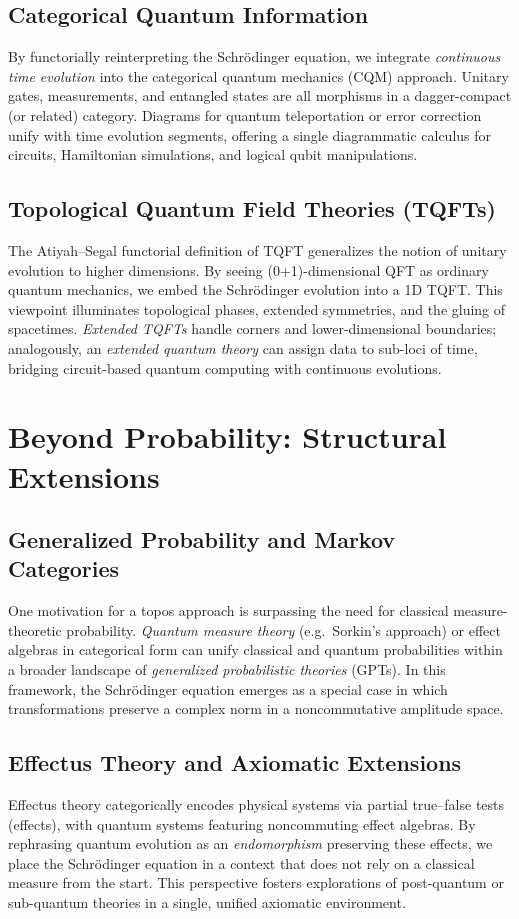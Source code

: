 \documentclass[12pt]{article}
\begin{document}
\subsection{Categorical Quantum Information}
By functorially reinterpreting the Schr\"odinger equation, we
integrate \emph{continuous time evolution} into the categorical
quantum mechanics (CQM) approach. Unitary gates, measurements,
and entangled states are all morphisms in a dagger-compact (or
related) category. Diagrams for quantum teleportation or error
correction unify with time evolution segments, offering a single
diagrammatic calculus for circuits, Hamiltonian simulations, and
logical qubit manipulations.

\subsection{Topological Quantum Field Theories (TQFTs)}
The Atiyah--Segal functorial definition of TQFT generalizes the
notion of unitary evolution to higher dimensions. By seeing
(0+1)-dimensional QFT as ordinary quantum mechanics, we embed
the Schr\"odinger evolution into a 1D TQFT. This viewpoint
illuminates topological phases, extended symmetries, and the
gluing of spacetimes. \emph{Extended TQFTs} handle corners and
lower-dimensional boundaries; analogously, an \emph{extended
quantum theory} can assign data to sub-loci of time, bridging
circuit-based quantum computing with continuous evolutions.

\section{Beyond Probability: Structural Extensions}
\subsection{Generalized Probability and Markov Categories}
One motivation for a topos approach is surpassing the need for
classical measure-theoretic probability. \emph{Quantum measure
theory} (e.g.\ Sorkin's approach) or effect algebras in categorical
form can unify classical and quantum probabilities within a broader
landscape of \emph{generalized probabilistic theories} (GPTs). In
this framework, the Schr\"odinger equation emerges as a special
case in which transformations preserve a complex norm in a
noncommutative amplitude space.

\subsection{Effectus Theory and Axiomatic Extensions}
Effectus theory categorically encodes physical systems via partial
true--false tests (effects), with quantum systems featuring
noncommuting effect algebras. By rephrasing quantum evolution as
an \emph{endomorphism} preserving these effects, we place the
Schr\"odinger equation in a context that does not rely on a
classical measure from the start. This perspective fosters
explorations of post-quantum or sub-quantum theories in a single,
unified axiomatic environment.
\end{document}
